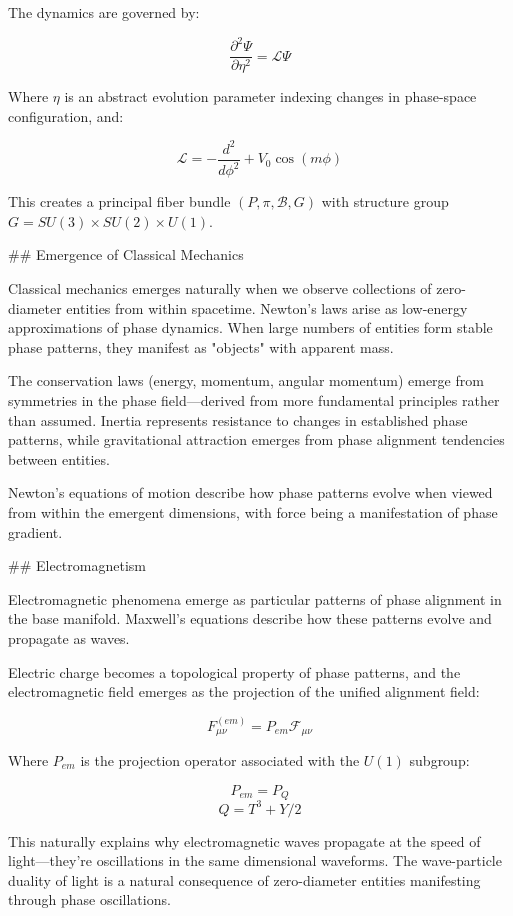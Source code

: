 The dynamics are governed by:

$$\frac{\partial^2\Psi}{\partial\eta^2} = \mathcal{L}\Psi$$

Where $\eta$ is an abstract evolution parameter indexing changes in phase-space configuration, and:

$$\mathcal{L} = -\frac{d^2}{d\phi^2} + V_0 \cos(m\phi)$$

This creates a principal fiber bundle $(P, \pi, \mathcal{B}, G)$ with structure group $G = SU(3) \times SU(2) \times U(1)$.

## Emergence of Classical Mechanics

Classical mechanics emerges naturally when we observe collections of zero-diameter entities from within spacetime. Newton's laws arise as low-energy approximations of phase dynamics. When large numbers of entities form stable phase patterns, they manifest as "objects" with apparent mass.

The conservation laws (energy, momentum, angular momentum) emerge from symmetries in the phase field—derived from more fundamental principles rather than assumed. Inertia represents resistance to changes in established phase patterns, while gravitational attraction emerges from phase alignment tendencies between entities.

Newton's equations of motion describe how phase patterns evolve when viewed from within the emergent dimensions, with force being a manifestation of phase gradient.

## Electromagnetism

Electromagnetic phenomena emerge as particular patterns of phase alignment in the base manifold. Maxwell's equations describe how these patterns evolve and propagate as waves.

Electric charge becomes a topological property of phase patterns, and the electromagnetic field emerges as the projection of the unified alignment field:

$$F_{\mu\nu}^{(em)} = P_{em}\mathcal{F}_{\mu\nu}$$

Where $P_{em}$ is the projection operator associated with the $U(1)$ subgroup:

$$P_{em} = P_{Q}$$ 
$$Q = T^3 + Y/2$$

This naturally explains why electromagnetic waves propagate at the speed of light—they're oscillations in the same dimensional waveforms. The wave-particle duality of light is a natural consequence of zero-diameter entities manifesting through phase oscillations.

